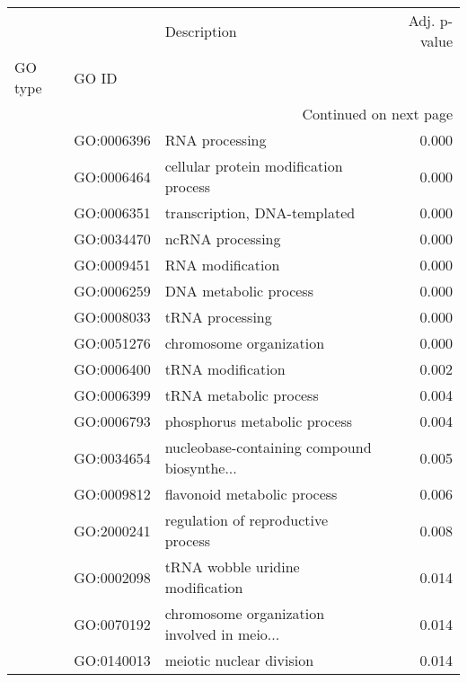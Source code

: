 \begin{longtable}{lllr}
\toprule
   &            &                                  Description &  Adj. p-value \\
GO type & GO ID &                                              &               \\
\midrule
\endhead
\midrule
\multicolumn{4}{r}{{Continued on next page}} \\
\midrule
\endfoot

\bottomrule
\endlastfoot
\multirow{40}{*}{BP} & GO:0006396 &                               RNA processing &         0.000 \\
   & GO:0006464 &        cellular protein modification process &         0.000 \\
   & GO:0006351 &                 transcription, DNA-templated &         0.000 \\
   & GO:0034470 &                             ncRNA processing &         0.000 \\
   & GO:0009451 &                             RNA modification &         0.000 \\
   & GO:0006259 &                        DNA metabolic process &         0.000 \\
   & GO:0008033 &                              tRNA processing &         0.000 \\
   & GO:0051276 &                      chromosome organization &         0.000 \\
   & GO:0006400 &                            tRNA modification &         0.002 \\
   & GO:0006399 &                       tRNA metabolic process &         0.004 \\
   & GO:0006793 &                 phosphorus metabolic process &         0.004 \\
   & GO:0034654 &  nucleobase-containing compound biosynthe... &         0.005 \\
   & GO:0009812 &                  flavonoid metabolic process &         0.006 \\
   & GO:2000241 &           regulation of reproductive process &         0.008 \\
   & GO:0002098 &             tRNA wobble uridine modification &         0.014 \\
   & GO:0070192 &  chromosome organization involved in meio... &         0.014 \\
   & GO:0140013 &                     meiotic nuclear division &         0.014 \\

\end{longtable}
